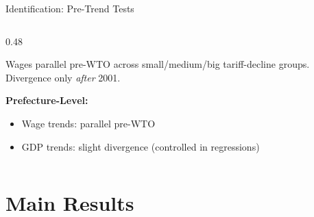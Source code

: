 \documentclass[10pt,aspectratio=169,t]{beamer}
\begin{document}
\begin{frame}{Identification: Pre-Trend Tests}
\begin{columns}[T]
\begin{column}{0.48\textwidth}

\medskip
\footnotesize
Wages parallel pre-WTO across small/medium/big tariff-decline groups. Divergence only \textit{after} 2001.

\bigskip
\normalsize
\textbf{Prefecture-Level:}
\begin{itemize}\footnotesize
    \item Wage trends: parallel pre-WTO
    \item GDP trends: slight divergence (controlled in regressions)
\end{itemize}
\end{column}
\end{columns}
\end{frame}

\section{Main Results}
\end{document}
